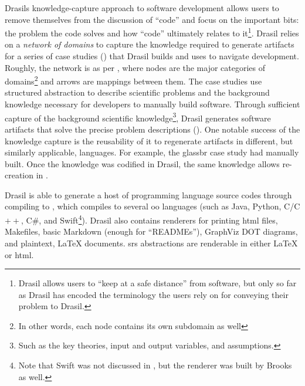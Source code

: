 \roughNetworkOfDomains{}

Drasils knowledge-capture approach to software development allows users to
remove themselves from the discussion of ``code'' and focus on the important
bits: the problem the code solves and how ``code'' ultimately relates to
it\footnote{Drasil allows users to ``keep at a safe distance'' from software,
      but only so far as Drasil has encoded the terminology the users rely on for
      conveying their problem to Drasil.}. Drasil relies on a \textit{network of
      domains} \cite{Czarnecki2005} to capture the knowledge required to generate
artifacts for a series of case studies () that Drasil
builds and uses to navigate development. Roughly, the network is as per
, where nodes are the major categories of
domains\footnote{In other words, each node contains its own subdomain as well}
and arrows are mappings between them. The case studies use structured 
\cite{SmithAndLai2005} abstraction to describe scientific problems and the
background knowledge necessary for developers to manually build software.
Through sufficient capture of the background scientific knowledge\footnote{Such
      as the key theories, input and output variables, and assumptions.}, Drasil
generates software artifacts that solve the precise problem descriptions
(). One notable success of the knowledge capture is
the reusability of it to regenerate artifacts in different, but similarly
applicable, languages. For example, the \acs{glassbr} case study had
manually built. Once the knowledge was codified in Drasil, the same knowledge
allows re-creation in .

\caseStudiesTable{}

Drasil is able to generate a host of  programming language source codes
through compiling to  \cite{Carette2019,MacLachlan2020}, which
compiles to several \acs{oo} languages (such as Java, Python, C/C$++$, C\#, and
Swift\footnote{Note that Swift was not discussed in \cite{MacLachlan2020}, but
      the renderer was built by Brooks as well.}). Drasil also contains renderers for
printing \acs{html} files, Makefiles, basic Markdown (enough for ``READMEs''),
GraphViz DOT \cite{Gansner1993} diagrams, and plaintext, \LaTeX{} documents.
\acs{srs} abstractions are renderable in either \LaTeX{} or \acs{html}.

